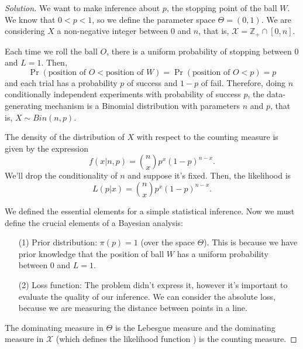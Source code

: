 \begin{proof}[Solution]
    We want to make inference about $p$, the stopping point of the ball $W$. We know that $0 < p < 1$, so we define the
    parameter space $\Theta = (0,1)$. We are considering $X$ a non-negative
    integer between $0$ and $n$, that is, $\mathcal{X} = \mathbb{Z}_+ \cap
    [0,n]$. 
    
    Each time we roll the ball $O$, there is a uniform probability of
    stopping between $0$ and $L = 1$. Then, 
    $$\Pr(\text{position of } O < \text{position of } W) = \Pr(\text{position of } O < p) = p$$
    and each trial has a probability $p$ of success and $1-p$ of fail. Therefore,
    doing $n$ conditionally independent experiments with probability of
    success $p$, the data-generating mechanism is a Binomial
    distribution with parameters $n$ and $p$, that is,
    $X \sim Bin(n,p)$. 

    The density of the distribution of $X$ with respect to the counting measure is given by the expression 
    $$
    f(x|n,p) = \binom{n}{x} p^x(1 - p)^{n-x}.
    $$
    We'll drop the conditionality of $n$ and suppose it's fixed. Then, the
    likelihood is 
    $$
    L(p|x) =  \genfrac(){0pt}{0}{n}{x} p^x(1 - p)^{n-x}.
    $$

    We defined the essential elements
    for a simple statistical inference. Now we must define the crucial elements of a Bayesian analysis: 

    \begin{enumerate}
        \item[(1)] Prior distribution: $\pi(p) = 1$ (over the space $\Theta$).
        This is because we have prior knowledge that the position of ball $W$ has a uniform probability
        between $0$ and $L = 1$. 
        \item[(2)] Loss function: The problem didn't express it, however  it's
        important to evaluate the quality of our inference. We can consider
        the absolute loss, because we are measuring the distance between
        points in a line. 
    \end{enumerate}

    The dominating measure in $\Theta$ is the Lebesgue measure and the
    dominating measure in $\mathcal{X}$ (which defines the likelihood
    function \cite[]{schervish1996theory}) is the counting measure. 
\end{proof}